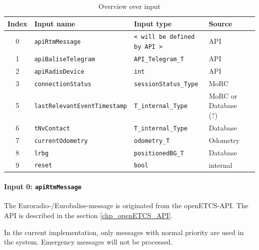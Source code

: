 \documentclass{template/openetcs_report}
\begin{document}
\begin{table}[H]
  \begin{tabular}{| c | l | l | l | l |}
    \hline
    \textbf{Index} & \textbf{Input name} & \textbf{Input type} & \textbf{Source}\\ \hline
    0 & \texttt{apiRtmMessage} & \texttt{< will be defined by API >} & API \\
    1 & \texttt{apiBaliseTelegram} & \texttt{API\_Telegram\_T} & API\\
    2 & \texttt{apiRadioDevice} & \texttt{int} & API\\
    3 & \texttt{connectionStatus} & \texttt{sessionStatus\_Type} & MoRC\\
    5 & \texttt{lastRelevantEventTimestamp} & \texttt{T\_internal\_Type} & MoRC or Database (?)\\
    6 & \texttt{tNvContact} & \texttt{T\_internal\_Type} & Database\\
    7 & \texttt{currentOdometry} & \texttt{odometry\_T} & Odometry\\
    8 & \texttt{lrbg} & \texttt{positionedBG\_T} & Database\\
    9 & \texttt{reset} & \texttt{bool} & internal\\
    \hline
  \end{tabular} 
  \caption{Overview over input}
  \label{tbl:ReceiveMessageAndCheckConsistencyInput}
\end{table}

\paragraph{Input 0: \texttt{apiRtmMessage}}

The Euroradio-/Eurobalise-message is originated from the openETCS-API. The API is described in the section \ref{chp_openETCS_API}.

In the current implementation, only messages with normal priority are used in the system. Emergency messages will not be processed.

\end{document}
